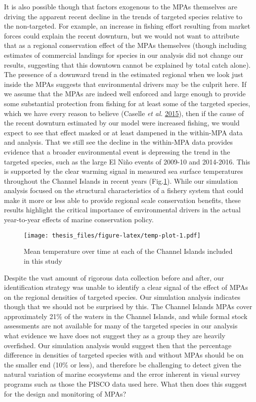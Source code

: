 \documentclass[twoside,12pt,final]{ucthesis-CA2012}
\begin{document}
\begin{ucmainmatter}
It is also possible though that factors exogenous to the MPAs themselves
are driving the apparent recent decline in the trends of targeted
species relative to the non-targeted. For example, an increase in
fishing effort resulting from market forces could explain the recent
downturn, but we would not want to attribute that as a regional
conservation effect of the MPAs themselves (though including estimates
of commercial landings for species in our analysis did not change our
results, suggesting that this downtown cannot be explained by total
catch alone). The presence of a downward trend in the estimated regional
when we look just inside the MPAs suggests that environmental drivers
may be the culprit here. If we assume that the MPAs are indeed well
enforced and large enough to provide some substantial protection from
fishing for at least some of the targeted species, which we have every
reason to believe (Caselle \emph{et al.}
\protect\hyperlink{ref-Caselle2015}{2015}), then if the cause of the
recent downturn estimated by our model were increased fishing, we would
expect to see that effect masked or at least dampened in the within-MPA
data and analysis. That we still see the decline in the within-MPA data
provides evidence that a broader environmental event is depressing the
trend in the targeted species, such as the large El Niño events of
2009-10 and 2014-2016. This is supported by the clear warming signal in
measured sea surface temperatures throughout the Channel Islands in
recent years (Fig.\ref{fig:temp-plot}). While our simulation analysis
focused on the structural characteristics of a fishery system that could
make it more or less able to provide regional scale conservation
benefits, these results highlight the critical importance of
environmental drivers in the actual year-to-year effects of marine
conservation policy.
\begin{figure}
\centering
\texttt{[image: thesis\_files/figure-latex/temp-plot-1.pdf]}
\caption{\label{fig:temp-plot}Mean temperature over time at each of the
Channel Islands included in this study}
\end{figure}
Despite the vast amount of rigorous data collection before and after,
our identification strategy was unable to identify a clear signal of the
effect of MPAs on the regional densities of targeted species. Our
simulation analysis indicates though that we should not be surprised by
this. The Channel Islands MPAs cover approximately 21\% of the waters in
the Channel Islands, and while formal stock assessments are not
available for many of the targeted species in our analysis what evidence
we have does not suggest they as a group they are heavily overfished.
Our simulation analysis would suggest then that the percentage
difference in densities of targeted species with and without MPAs should
be on the smaller end (10\% or less), and therefore be challenging to
detect given the natural variation of marine ecosystems and the error
inherent in visual survey programs such as those the PISCO data used
here. What then does this suggest for the design and monitoring of MPAs?


\end{ucmainmatter}
\end{document}
